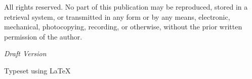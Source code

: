 \documentclass[11pt,letterpaper,twoside]{book}
\begin{document}

\frontmatter

\maketitlepage

\thispagestyle{empty}
\vspace*{\fill}
\begin{center}
\textcopyright{} \textbookyear{} \authorname

\vspace{1cm}

All rights reserved. No part of this publication may be reproduced, stored in a retrieval system, or transmitted in any form or by any means, electronic, mechanical, photocopying, recording, or otherwise, without the prior written permission of the author.

\vspace{1cm}

\textit{Draft Version \textbookversion}

\vspace{0.5cm}

Typeset using \LaTeX

\vspace{1cm}

\authorinstitution\\
\authorcollege\\
\authordepartment\\
\authorlocation
\end{center}
\vspace*{\fill}
\newpage

\makeauthorpage

\makepreface

\tableofcontents

\listoffigures

\listoftables

\mainmatter

\end{document}
